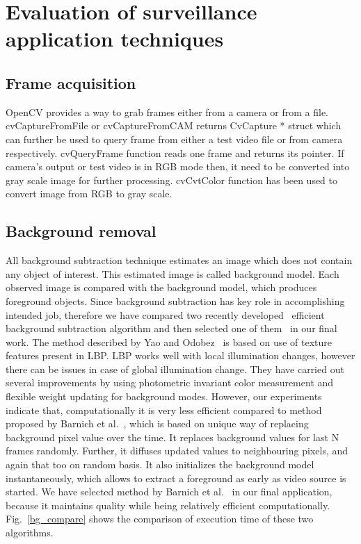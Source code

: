 \section {Evaluation of surveillance application techniques}
\subsection{Frame acquisition}
\indent OpenCV provides a way to grab frames either from a camera or
from a file. cvCaptureFromFile or cvCaptureFromCAM returns CvCapture *
struct which can further be used to query frame from either a test video
file or from camera respectively. cvQueryFrame function reads one frame
and returns its pointer. If camera's output or test video is in RGB mode
then, it need to be converted into gray scale image for further
processing. cvCvtColor function has been used to convert image from RGB
to gray scale.
\subsection{Background removal}
\indent All background subtraction technique estimates an image which
does not contain any object of interest. This estimated image is called
background model. Each observed image is compared with the background
model, which produces foreground objects.
\indent Since background subtraction has key role in accomplishing
intended job, therefore we have compared two recently developed~\cite{3,
5} efficient background subtraction algorithm and then selected one of
them~\cite{5} in our final work. The method described by Yao and
Odobez~\cite{3} is based on use of texture features present in LBP.
 LBP works well with local illumination changes,
however there can be issues in case of global illumination change. They
have carried out several improvements by using photometric invariant
color measurement and flexible weight updating for background
modes. However, our experiments indicate that, computationally it is very
less efficient compared to method proposed by Barnich et al.~\cite{9},
which is based on unique way of replacing background pixel value over
the time. It replaces background values for last N frames randomly.
Further, it diffuses updated values to neighbouring pixels, and
again that too on random basis. It also initializes the
background model instantaneously, which allows to extract a foreground
as early as video source is started. We have selected method by Barnich et
al.~\cite{9} in our final application, because it maintains quality
while being relatively efficient computationally. Fig.~\ref{bg_compare} shows the
comparison of execution time of these two algorithms.

